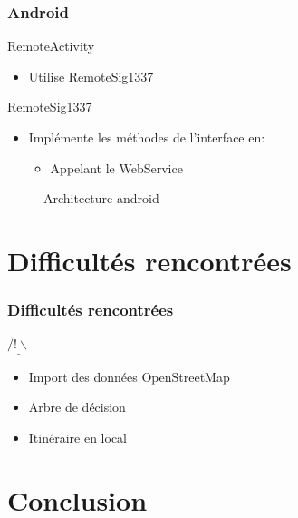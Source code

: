\documentclass{beamer}
\begin{document}
\begin{frame}
\frametitle{Android}
\begin{block}{RemoteActivity}
\begin{itemize}
\item Utilise RemoteSig1337
\end{itemize}
\end{block}
\begin{block}{RemoteSig1337}
\begin{itemize}
\item Implémente les méthodes de l'interface en:\begin{itemize}
\item Appelant le WebService
\end{itemize}
\end{itemize}
\end{block}
\end{frame}

\begin{frame}
\begin{figure}
\centering
{}
\caption{Architecture android}
\end{figure}
\end{frame}


\section{Difficultés rencontrées}
\begin{frame}
\frametitle{Difficultés rencontrées}
\begin{alertblock}{$\underline{/\hat{!}\backslash}$}
\begin{itemize}
\item Import des données OpenStreetMap
\item Arbre de décision
\item Itinéraire en local
\end{itemize}
\end{alertblock}
\end{frame}


\section{Conclusion}
\begin{frame}
\end{frame}
\end{document}

